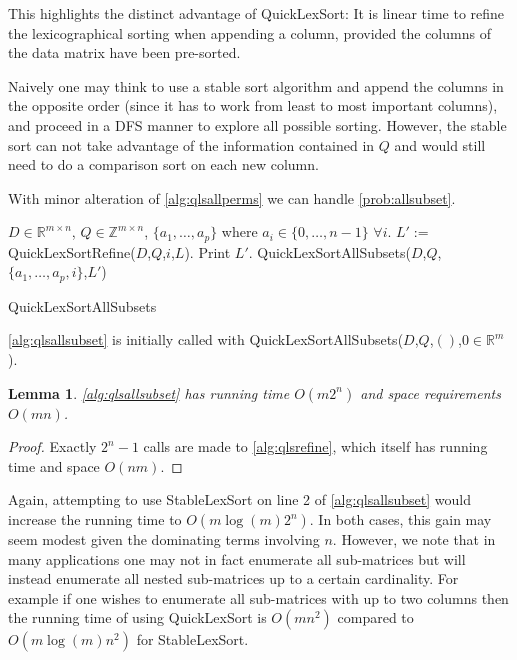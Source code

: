 \documentclass[a4paper,10pt,reqno]{amsart}
\newcommand\Z{\mathbb Z}
\newcommand\R{\mathbb R}
\newtheorem{lemma}{Lemma}
\theoremstyle{definition}
\begin{document}
This highlights the distinct advantage of QuickLexSort: It is linear time to
refine the lexicographical sorting when appending a column, provided the
columns of the data matrix have been pre-sorted.

Naively one may think to use a stable sort algorithm and append the columns in
the opposite order (since it has to work from least to most important columns),
and proceed in a DFS manner to explore all possible sorting. However, the
stable sort can not take advantage of the information contained in $Q$ and
would still need to do a comparison sort on each new column. 

With minor alteration of \autoref{alg:qlsallperms} we can handle \autoref{prob:allsubset}.

\begin{algorithm}
\begin{algorithmic}[1]
    \REQUIRE $D \in \R^{m\times n}$, $Q \in \Z^{m\times n}$, $\{a_1,\ldots,a_p\}$ where $ a_i \in \{0,\ldots,n-1\}$ $\forall i$.
        \STATE $L' := $QuickLexSortRefine($D$,$Q$,$i$,$L$).
        \STATE Print $L'$.
        \STATE QuickLexSortAllSubsets($D$,$Q$,$\{a_1,\ldots,a_p,i\}$,$L'$)
    \ENDFOR
\end{algorithmic}
\caption{QuickLexSortAllSubsets}
\label{alg:qlsallsubset}
\end{algorithm}

\autoref{alg:qlsallsubset} is initially called with QuickLexSortAllSubsets($D$,$Q$,$()$,$0\in \R^m$).

\begin{lemma}
    \autoref{alg:qlsallsubset} has running time $O\left(m 2^n\right)$ and space requirements $O(mn)$.
\end{lemma}
\begin{proof}
    Exactly $2^n - 1$ calls are made to \autoref{alg:qlsrefine}, which itself has running time and space $O(nm)$.
\end{proof}

Again, attempting to use StableLexSort on line 2 of \autoref{alg:qlsallsubset}
would increase the running time to $O(m\log(m) 2^n)$. In both cases, this gain
may seem modest given the dominating terms involving $n$. However, we note that
in many applications one may not in fact enumerate all sub-matrices but will
instead enumerate all nested sub-matrices up to a certain cardinality.  For
example if one wishes to enumerate all sub-matrices with up to two columns
then the running time of using QuickLexSort is $O(m n^2)$ compared to $O(m \log(m) n^2)$ 
for StableLexSort.
\end{document}
